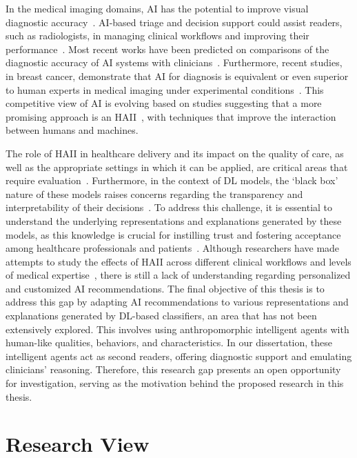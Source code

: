 In the medical imaging domains, \ac{AI} has the potential to improve visual diagnostic accuracy~\cite{Tschandl2020}.
\ac{AI}-based triage and decision support could assist readers, such as radiologists, in managing clinical workflows and improving their performance~\cite{McKinney2020}.
Most recent works have been predicted on comparisons of the diagnostic accuracy of \ac{AI} systems with clinicians~\cite{He2019, 10.1145/3313831.3376290}.
Furthermore, recent studies, in breast cancer, demonstrate that \ac{AI} for diagnosis is equivalent or even superior to human experts in medical imaging under experimental conditions~\cite{Ribli2018, McKinney2020}.
This competitive view of \ac{AI} is evolving based on studies suggesting that a more promising approach is an \ac{HAII}~\cite{10.1145/3313831.3376807, 10.1145/3313831.3376301}, with techniques that improve the interaction between humans and machines.

The role of \ac{HAII} in healthcare delivery and its impact on the quality of care, as well as the appropriate settings in which it can be applied, are critical areas that require evaluation~\cite{Tschandl2020}.
Furthermore, in the context of \ac{DL} models, the `black box' nature of these models raises concerns regarding the transparency and interpretability of their decisions~\cite{9473208}.
To address this challenge, it is essential to understand the underlying representations and explanations generated by these models, as this knowledge is crucial for instilling trust and fostering acceptance among healthcare professionals and patients~\cite{10.1145/3544548.3581075, EVANS2022281}.
Although researchers have made attempts to study the effects of \ac{HAII} across different clinical workflows and levels of medical expertise~\cite{doi:10.1148/radiol.2019182627}, there is still a lack of understanding regarding personalized and customized \ac{AI} recommendations.
The final objective of this thesis is to address this gap by adapting \ac{AI} recommendations to various representations and explanations generated by \ac{DL}-based classifiers, an area that has not been extensively explored.
This involves using anthropomorphic intelligent agents with human-like qualities, behaviors, and characteristics.
In our dissertation, these intelligent agents act as second readers, offering diagnostic support and emulating clinicians' reasoning.
Therefore, this research gap presents an open opportunity for investigation, serving as the motivation behind the proposed research in this thesis.

\section{Research View}
\label{sec:chap001002}

